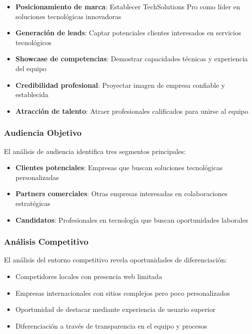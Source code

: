 \begin{itemize}
    \item \textbf{Posicionamiento de marca}: Establecer TechSolutions Pro como líder en soluciones tecnológicas innovadoras
    \item \textbf{Generación de leads}: Captar potenciales clientes interesados en servicios tecnológicos
    \item \textbf{Showcase de competencias}: Demostrar capacidades técnicas y experiencia del equipo
    \item \textbf{Credibilidad profesional}: Proyectar imagen de empresa confiable y establecida
    \item \textbf{Atracción de talento}: Atraer profesionales calificados para unirse al equipo
\end{itemize}

\subsubsection{Audiencia Objetivo}
El análisis de audiencia identifica tres segmentos principales:

\begin{itemize}
    \item \textbf{Clientes potenciales}: Empresas que buscan soluciones tecnológicas personalizadas
    \item \textbf{Partners comerciales}: Otras empresas interesadas en colaboraciones estratégicas
    \item \textbf{Candidatos}: Profesionales en tecnología que buscan oportunidades laborales
\end{itemize}

\subsubsection{Análisis Competitivo}
El análisis del entorno competitivo revela oportunidades de diferenciación:

\begin{itemize}
    \item Competidores locales con presencia web limitada
    \item Empresas internacionales con sitios complejos pero poco personalizados
    \item Oportunidad de destacar mediante experiencia de usuario superior
    \item Diferenciación a través de transparencia en el equipo y procesos
\end{itemize}

